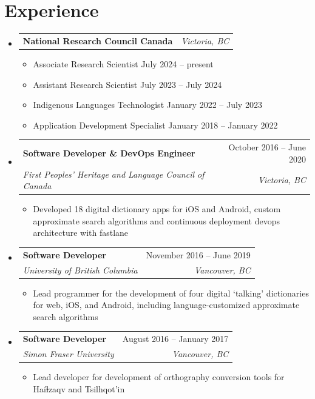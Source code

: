 \documentclass[letterpaper,11pt]{article}
\makeatletter
\newcommand{\resumeItem}[1]{
  \item\small{
    {#1 \vspace{-2pt}}
  }
}
\newcommand{\resumeSubheading}[4]{
  \vspace{-2pt}\item
    \begin{tabular*}{0.97\textwidth}[t]{l@{\extracolsep{\fill}}r}
      \textbf{#1} & #2 \\
      \textit{\small#3} & \textit{\small #4} \\
    \end{tabular*}\vspace{-7pt}
}
\newcommand{\resumeOrgHeading}[2]{
  \vspace{-2pt}\item
    \begin{tabular*}{0.97\textwidth}[t]{l@{\extracolsep{\fill}}r}
      \textbf{#1} & \textit{\small #2} \\
    \end{tabular*}\vspace{-7pt}
}
\newcommand{\resumeRole}[2]{
  \item\small{#1 \hfill #2\hspace*{\dimexpr0.03\textwidth-0.15in\relax}}\vspace{-2pt}
}
\newcommand{\resumeSubHeadingListStart}{\begin{itemize}[leftmargin=0.15in, label={}]}
\newcommand{\resumeSubHeadingListEnd}{\end{itemize}}
\newcommand{\resumeItemListStart}{\begin{itemize}}
\newcommand{\resumeItemListEnd}{\end{itemize}\vspace{-5pt}}
\makeatother
\begin{document}
\section{Experience}
  \resumeSubHeadingListStart
    \resumeOrgHeading{National Research Council Canada}{Victoria, BC}
      \resumeItemListStart
        \resumeRole{Associate Research Scientist}{July 2024 – present}
        \resumeRole{Assistant Research Scientist}{July 2023 – July 2024}
        \resumeRole{Indigenous Languages Technologist}{January 2022 – July 2023}
        \resumeRole{Application Development Specialist}{January 2018 – January 2022}
      \resumeItemListEnd
      \vspace{4pt}
    \resumeSubheading
      {Software Developer \& DevOps Engineer}{October 2016 – June 2020}
      {First Peoples' Heritage and Language Council of Canada}{Victoria, BC}
      \resumeItemListStart
        \resumeItem{Developed 18 digital dictionary apps for iOS and Android, custom approximate search algorithms and continuous deployment devops architecture with fastlane}
      \resumeItemListEnd
    \resumeSubheading
      {Software Developer}{November 2016 – June 2019}
      {University of British Columbia}{Vancouver, BC}
      \resumeItemListStart
        \resumeItem{Lead programmer for the development of four digital `talking' dictionaries for web, iOS, and Android, including language-customized approximate search algorithms}
      \resumeItemListEnd
    \resumeSubheading
      {Software Developer}{August 2016 – January 2017}
      {Simon Fraser University}{Vancouver, BC}
      \resumeItemListStart
        \resumeItem{Lead developer for development of orthography conversion tools for Haíɫzaqv and Tsilhqot'in}
      \resumeItemListEnd
  \resumeSubHeadingListEnd

\end{document}
